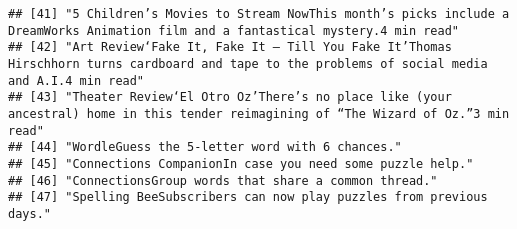 \documentclass[
]{article}
\begin{document}
\begin{verbatim}
## [41] "5 Children’s Movies to Stream NowThis month’s picks include a DreamWorks Animation film and a fantastical mystery.4 min read"                                                                                                                                                                                                                                                                                         
## [42] "Art Review‘Fake It, Fake It — Till You Fake It’Thomas Hirschhorn turns cardboard and tape to the problems of social media and A.I.4 min read"                                                                                                                                                                                                                                                                         
## [43] "Theater Review‘El Otro Oz’There’s no place like (your ancestral) home in this tender reimagining of “The Wizard of Oz.”3 min read"                                                                                                                                                                                                                                                                                    
## [44] "WordleGuess the 5-letter word with 6 chances."                                                                                                                                                                                                                                                                                                                                                                        
## [45] "Connections CompanionIn case you need some puzzle help."                                                                                                                                                                                                                                                                                                                                                              
## [46] "ConnectionsGroup words that share a common thread."                                                                                                                                                                                                                                                                                                                                                                   
## [47] "Spelling BeeSubscribers can now play puzzles from previous days."                                                                                                                                                                                                                                                                                                                                                     

\end{verbatim}
\end{document}
